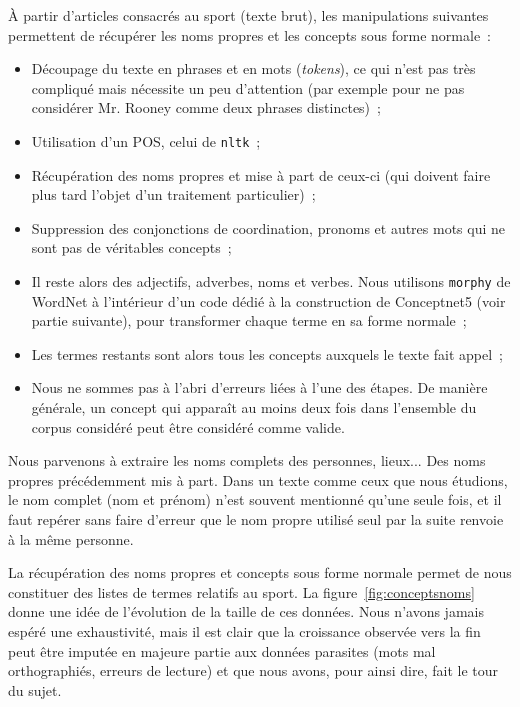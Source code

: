\documentclass[a4paper, 12pt]{article}
\newcommand{\pyt}[1]{\texttt{#1}}%
\newcommand{\ang}[1]{\textit{#1}}%
\begin{document}
\`A partir d'articles consacrés au sport (texte brut), les manipulations suivantes permettent de récupérer les noms propres et les concepts sous forme normale~:
\begin{itemize}
 \item Découpage du texte en phrases et en mots (\ang{tokens}), ce qui n'est pas très compliqué mais nécessite un peu d'attention (par exemple pour ne pas considérer Mr. Rooney comme deux phrases distinctes)~;
 \item Utilisation d'un POS, celui de \pyt{nltk}~;
 \item Récupération des noms propres et mise à part de ceux-ci (qui doivent faire plus tard l'objet d'un traitement particulier)~;
 \item Suppression des conjonctions de coordination, pronoms et autres mots qui ne sont pas de véritables concepts~;
 \item Il reste alors des adjectifs, adverbes, noms et verbes. Nous utilisons \pyt{morphy} de WordNet à l'intérieur d'un code dédié à la construction de Conceptnet5 (voir partie suivante), pour transformer chaque terme en sa forme normale~;
 \item Les termes restants sont alors tous les concepts auxquels le texte fait appel~;
 \item Nous ne sommes pas à l'abri d'erreurs liées à l'une des étapes. De manière générale, un concept qui apparaît au moins deux fois dans l'ensemble du corpus considéré peut être considéré comme valide.
\end{itemize}

Nous parvenons à extraire les noms complets des personnes, lieux... Des noms propres précédemment mis à part. Dans un texte comme ceux que nous étudions, le nom complet (nom et prénom) n'est souvent mentionné qu'une seule fois, et il faut repérer sans faire d'erreur que le nom propre utilisé seul par la suite renvoie à la même personne.

La récupération des noms propres et concepts sous forme normale permet de nous constituer des listes de termes relatifs au sport. La figure~\ref{fig:conceptsnoms} donne une idée de l'évolution de la taille de ces données. Nous n'avons jamais espéré une exhaustivité, mais il est clair que la croissance observée vers la fin peut être imputée en majeure partie aux données parasites (mots mal orthographiés, erreurs de lecture) et que nous avons, pour ainsi dire, fait le tour du sujet.
\end{document}
